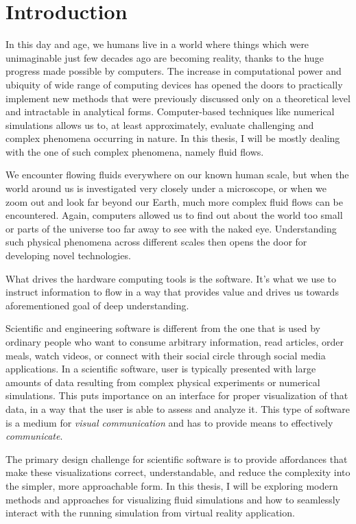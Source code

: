 \section{Introduction}\label{sec:intro}

In this day and age, we humans live in a world where things which were unimaginable just few decades ago are becoming reality, thanks to the huge progress made possible by computers. The increase in computational power and ubiquity of wide range of computing devices has opened the doors to practically implement new methods that were previously discussed only on a theoretical level and intractable in analytical forms. Computer-based techniques like numerical simulations allows us to, at least approximately, evaluate challenging and complex phenomena occurring in nature. In this thesis, I will be mostly dealing with the one of such complex phenomena, namely fluid flows. 

We encounter flowing fluids everywhere on our known human scale, but when the world around us is investigated very closely under a microscope, or when we zoom out and look far beyond our Earth, much more complex fluid flows can be encountered. Again, computers allowed us to find out about the world too small or parts of the universe too far away to see with the naked eye. Understanding such physical phenomena across different scales then opens the door for developing novel technologies.

What drives the hardware computing tools is the software. It's what we use to instruct information to flow in a way that provides value and drives us towards aforementioned goal of deep understanding. 

Scientific and engineering software is different from the one that is used by ordinary people who want to consume arbitrary information, read articles, order meals, watch videos, or connect with their social circle through social media applications. In a scientific software, user is typically presented with large amounts of data resulting from complex physical experiments or numerical simulations. This puts importance on an interface for proper visualization of that data, in a way that the user is able to assess and analyze it. This type of software is a medium for \emph{visual communication} and has to provide means to effectively \emph{communicate}.

The primary design challenge for scientific software is to provide affordances that make these visualizations correct, understandable, and reduce the complexity into the simpler, more approachable form. In this thesis, I will be exploring modern methods and approaches for visualizing fluid simulations and how to seamlessly interact with the running simulation from virtual reality application.

